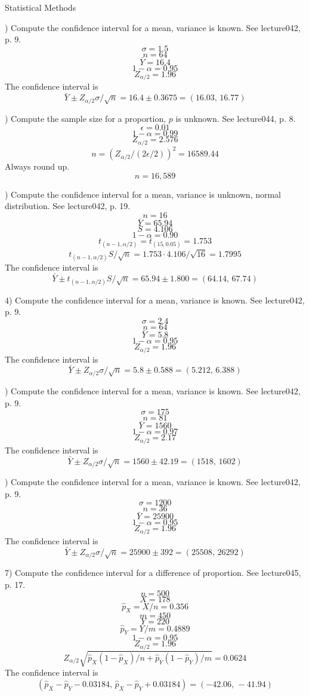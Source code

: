 \parindent=0pt
Statistical Methods

) Compute the confidence interval for a mean, variance is known.
See lecture042, p. 9.
$$\sigma=1.5$$
$$n=64$$
$$\bar Y=16.4$$
$$1-\alpha=0.95$$
$$Z_{\alpha/2}=1.96$$
The confidence interval is
$$\bar Y\pm Z_{\alpha/2}\sigma/\sqrt n=16.4\pm0.3675
=(16.03,\,16.77)$$

\bigskip
{}) Compute the sample size for a proportion, $p$ is unknown.
See lecture044, p. 8.
$$\epsilon=0.01$$
$$1-\alpha=0.99$$
$$Z_{\alpha/2}=2.576$$
$$n=(Z_{\alpha/2}/(2\epsilon/2))^2=16589.44$$
Always round up.
$$n=16{,}589$$

\bigskip
{}) Compute the confidence interval for a mean, variance is unknown,
normal distribution.
See lecture042, p. 19.
$$n=16$$
$$\bar Y=65.94$$
$$S=4.106$$
$$1-\alpha=0.90$$
$$t_{(n-1,\alpha/2)}=t_{(15,0.05)}=1.753$$
$$t_{(n-1,\alpha/2)}S/\sqrt n=1.753\cdot4.106/\sqrt{16}=1.7995$$
The confidence interval is
$$\bar Y\pm t_{(n-1,\alpha/2)}S/\sqrt n
=65.94\pm1.800=(64.14,\,67.74)$$

\vfill
\eject

4) Compute the confidence interval for a mean, variance is known.
See lecture042, p. 9.
$$\sigma=2.4$$
$$n=64$$
$$\bar Y=5.8$$
$$1-\alpha=0.95$$
$$Z_{\alpha/2}=1.96$$
The confidence interval is
$$\bar Y\pm Z_{\alpha/2}\sigma/\sqrt n=5.8\pm0.588
=(5.212,\,6.388)$$

\bigskip
{}) Compute the confidence interval for a mean, variance is known.
See lecture042, p. 9.
$$\sigma=175$$
$$n=81$$
$$\bar Y=1560$$
$$1-\alpha=0.97$$
$$Z_{\alpha/2}=2.17$$
The confidence interval is
$$\bar Y\pm Z_{\alpha/2}\sigma/\sqrt n=1560\pm42.19
=(1518,\,1602)$$

\bigskip
{}) Compute the confidence interval for a mean, variance is known.
See lecture042, p. 9.
$$\sigma=1200$$
$$n=36$$
$$\bar Y=25900$$
$$1-\alpha=0.95$$
$$Z_{\alpha/2}=1.96$$
The confidence interval is
$$\bar Y\pm Z_{\alpha/2}\sigma/\sqrt n=25900\pm392
=(25508,\,26292)$$

\vfill
\eject

7) Compute the confidence interval for a difference of proportion.
See lecture045, p. 17.
$$n=500$$
$$X=178$$
$$\hat p_X=X/n=0.356$$
$$m=450$$
$$Y=220$$
$$\hat p_Y=Y/m=0.4889$$
$$1-\alpha=0.95$$
$$Z_{\alpha/2}=1.96$$
$$Z_{\alpha/2}\sqrt{\hat p_X(1-\hat p_X)/n+\hat p_Y(1-\hat p_Y)/m}
=0.0624$$
The confidence interval is
$$(\hat p_X-\hat p_Y-0.03184,\,\hat p_X-\hat p_Y+0.03184)
=(-42.06,\,-41.94)$$

